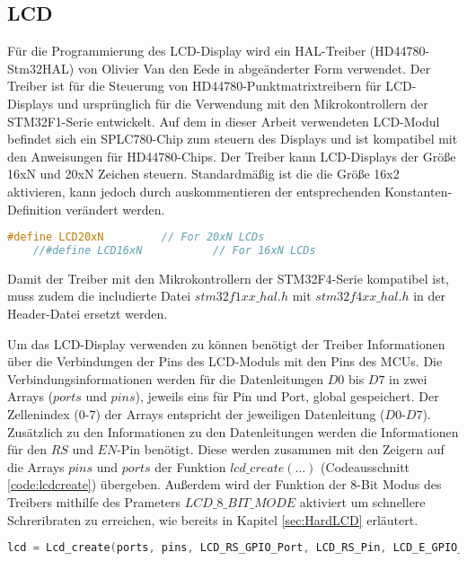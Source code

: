 \subsection{LCD}
Für die Programmierung des LCD-Display wird ein HAL-Treiber (HD44780-Stm32HAL) von Olivier Van den Eede in abgeänderter Form verwendet. Der Treiber ist für die Steuerung von HD44780-Punktmatrixtreibern für LCD-Displays und ursprünglich für die Verwendung mit den Mikrokontrollern der STM32F1-Serie entwickelt. Auf dem in dieser Arbeit verwendeten LCD-Modul befindet sich ein SPLC780-Chip zum steuern des Displays und ist kompatibel mit den Anweisungen für HD44780-Chips. Der Treiber kann LCD-Displays der Größe 16xN und 20xN Zeichen steuern. Standardmäßig ist die die Größe 16x2 aktivieren, kann jedoch durch auskommentieren der entsprechenden Konstanten-Definition verändert werden. 
\begin{lstlisting}[firstnumber=16, language=C, caption = lcd.h: Einstellung Displaygröße, label = code:lcdsize]
	#define LCD20xN 		// For 20xN LCDs
	//#define LCD16xN			// For 16xN LCDs
\end{lstlisting}
Damit der Treiber mit den Mikrokontrollern der STM32F4-Serie kompatibel ist, muss zudem die includierte Datei $stm32f1xx\_hal.h$ mit $stm32f4xx\_hal.h$ in der Header-Datei ersetzt werden.

Um das LCD-Display verwenden zu können benötigt der Treiber Informationen über die Verbindungen der Pins des LCD-Moduls mit den Pins des MCUs. Die Verbindungsinformationen werden für die Datenleitungen $D0$ bis $D7$ in zwei Arrays ($ports$ und $pins$), jeweils eins für Pin und Port, global gespeichert. Der Zellenindex (0-7) der Arrays entspricht der jeweiligen Datenleitung ($D0$-$D7$). Zusätzlich zu den Informationen zu den Datenleitungen werden die Informationen für den $RS$ und $EN$-Pin benötigt. Diese werden zusammen mit den Zeigern auf die Arrays $pins$ und $ports$ der Funktion $lcd\_create(...)$ (Codeausschnitt \ref{code:lcdcreate}) übergeben. Außerdem wird der Funktion der 8-Bit Modus des Treibers mithilfe des Prameters $LCD\_8\_BIT\_MODE$ aktiviert um schnellere Schreribraten zu erreichen, wie bereits in Kapitel \ref{sec:HardLCD} erläutert.
\begin{lstlisting}[firstnumber=302, language=C, caption = main.c: Funktionsaufruf lcd\_create(...), label = code:lcdcreate, breaklines = true]
lcd = Lcd_create(ports, pins, LCD_RS_GPIO_Port, LCD_RS_Pin, LCD_E_GPIO_Port, LCD_E_Pin, LCD_8_BIT_MODE);
\end{lstlisting}

